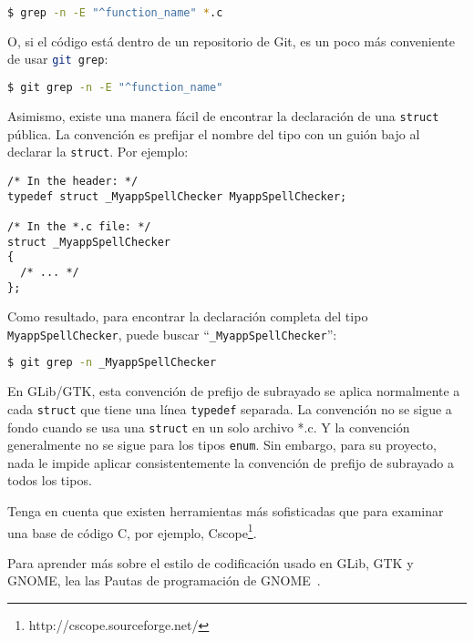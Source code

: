\begin{lstlisting}[language=bash]
$ grep -n -E "^function_name" *.c
\end{lstlisting}

O, si el código está dentro de un repositorio de Git, es un poco más conveniente de usar \lstinline[language=bash]{git grep}:

\begin{lstlisting}[language=bash]
$ git grep -n -E "^function_name"
\end{lstlisting}

Asimismo, existe una manera fácil de encontrar la declaración de una \lstinline{struct} pública. La convención es prefijar el nombre del tipo con un guión bajo al declarar la \lstinline{struct}. Por ejemplo:
\begin{lstlisting}
/* In the header: */
typedef struct _MyappSpellChecker MyappSpellChecker;

/* In the *.c file: */
struct _MyappSpellChecker
{
  /* ... */
};
\end{lstlisting}

Como resultado, para encontrar la declaración completa del tipo \lstinline{MyappSpellChecker}, puede buscar ``\lstinline{_MyappSpellChecker}'':

\begin{lstlisting}[language=bash]
$ git grep -n _MyappSpellChecker
\end{lstlisting}

En GLib/GTK, esta convención de prefijo de subrayado se aplica normalmente a cada \lstinline{struct} que tiene una línea \lstinline{typedef} separada. La convención no se sigue a fondo cuando se usa una \lstinline{struct} en un solo archivo *.c. Y la convención generalmente no se sigue para los tipos \lstinline{enum}. Sin embargo, para su proyecto, nada le impide aplicar consistentemente la convención de prefijo de subrayado a todos los tipos.

Tenga en cuenta que existen herramientas más sofisticadas que  para examinar una base de código C, por ejemplo, Cscope\footnote{http://cscope.sourceforge.net/}.

Para aprender más sobre el estilo de codificación usado en GLib, GTK y GNOME, lea las Pautas de programación de GNOME~\cite{gnome-programming-guidelines}.